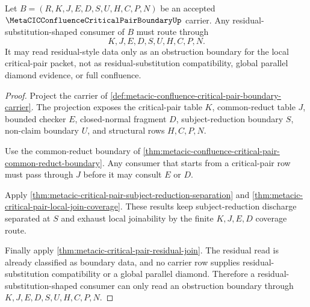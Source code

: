 \begin{theorem}
\label{thm:metacic-critical-pair-residual-substitution-obstruction-route}
Let $B=(R,K,J,E,D,S,U,H,C,P,N)$ be an accepted
$\MetaCICConfluenceCriticalPairBoundaryUp$ carrier. Any
residual-substitution-shaped consumer of $B$ must route through
$$
K,J,E,D,S,U,H,C,P,N .
$$
It may read residual-style data only as an obstruction boundary for the local
critical-pair packet, not as residual-substitution compatibility, global
parallel diamond evidence, or full confluence.
\end{theorem}
\begin{proof}
Project the carrier of
\autoref{def:metacic-confluence-critical-pair-boundary-carrier}. The
projection exposes the critical-pair table $K$, common-reduct table $J$,
bounded checker $E$, closed-normal fragment $D$, subject-reduction boundary
$S$, non-claim boundary $U$, and structural rows $H,C,P,N$.

Use the common-reduct boundary of
\autoref{thm:metacic-confluence-critical-pair-common-reduct-boundary}. Any
consumer that starts from a critical-pair row must pass through $J$ before it
may consult $E$ or $D$.

Apply \autoref{thm:metacic-critical-pair-subject-reduction-separation} and
\autoref{thm:metacic-critical-pair-local-join-coverage}. These results keep
subject-reduction discharge separated at $S$ and exhaust local joinability by
the finite $K,J,E,D$ coverage route.

Finally apply \autoref{thm:metacic-critical-pair-residual-join}. The residual
read is already classified as boundary data, and no carrier row supplies
residual-substitution compatibility or a global parallel diamond. Therefore a
residual-substitution-shaped consumer can only read an obstruction boundary
through $K,J,E,D,S,U,H,C,P,N$.
\end{proof}

